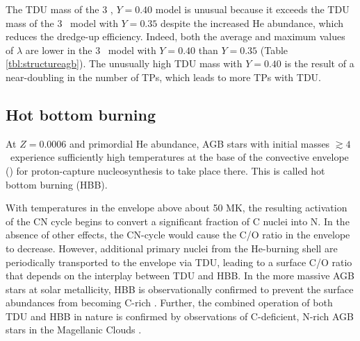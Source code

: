 The TDU mass of the 3 \Msun, $Y=0.40$ model is unusual because it exceeds the TDU mass of the 3 \Msun\ model with $Y=0.35$ despite the increased He abundance, which reduces the dredge-up efficiency. Indeed, both the average and maximum values of $\lambda$ are lower in the 3 \Msun\ model with $Y=0.40$ than $Y=0.35$ (Table \ref{tbl:structureagb}). The unusually high TDU mass with $Y=0.40$ is the result of a near-doubling in the number of TPs, which leads to more TPs with TDU.

\subsection{Hot bottom burning}\label{sec:hbb}
At $Z=0.0006$ and primordial He abundance, AGB stars with initial masses $\gtrsim 4$ \Msun\ experience sufficiently high temperatures at the base of the convective envelope () for proton-capture nucleosynthesis to take place there. This is called hot bottom burning (HBB).

With temperatures in the envelope above about 50 MK, the resulting activation of the CN cycle begins to convert a significant fraction of C nuclei into N. In the absence of other effects, the CN-cycle would cause the C/O ratio in the envelope to decrease. However, additional primary  nuclei from the He-burning shell are periodically transported to the envelope via TDU, leading to a surface C/O ratio that depends on the interplay between TDU and HBB. In the more massive AGB stars at solar metallicity, HBB is observationally confirmed to prevent the surface abundances from becoming C-rich \citep[C/O $>$ 1;][]{Lattanzio:1992uz,Boothroyd:1993dj}. Further, the combined operation of both TDU and HBB in nature is confirmed by observations of C-deficient, N-rich AGB stars in the Magellanic Clouds \citep{McSaveney:2007ks}.

